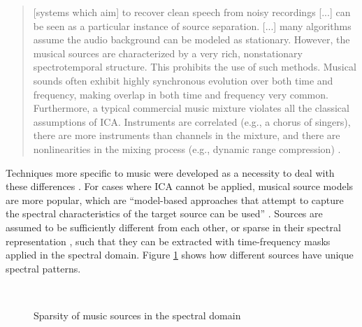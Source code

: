 \documentclass[report.tex]{subfiles}
\begin{document}
\begin{quote}
	[systems which aim] to recover clean speech from noisy recordings [...] can be seen as a particular instance of source separation. [...] many algorithms assume the audio background can be modeled as stationary. However, the musical sources are characterized by a very rich, nonstationary spectrotemporal structure. This prohibits the use of such methods. Musical sounds often exhibit highly synchronous evolution over both time and frequency, making overlap in both time and frequency very common. Furthermore, a typical commercial music mixture violates all the classical assumptions of ICA. Instruments are correlated (e.g., a chorus of singers), there are more instruments than channels in the mixture, and there are nonlinearities in the mixing process (e.g., dynamic range compression) \parencite[1]{musicsepintro1}.
\end{quote}

Techniques more specific to music were developed as a necessity to deal with these differences \parencite{musicseptechniques1, musicseptechniques2}. For cases where ICA cannot be applied, musical source models are more popular, which are ``model-based approaches that attempt to capture the spectral characteristics of the target source can be used'' \parencite[36]{musicsepgood}. Sources are assumed to be sufficiently different from each other, or sparse in their spectral representation \parencite{musicsepgood}, such that they can be extracted with time-frequency masks applied in the spectral domain. Figure \ref{fig:sepgood} shows how different sources have unique spectral patterns.

\begin{figure}[ht]
	\centering
	\\
	\caption{Sparsity of music sources in the spectral domain \parencite[32]{musicsepgood}}
\label{fig:sepgood}
\end{figure}
\end{document}
